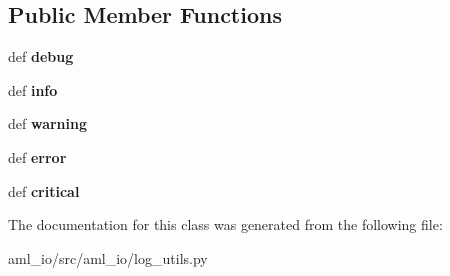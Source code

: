 \subsection*{Public Member Functions}
\begin{DoxyCompactItemize}
\item 
\hypertarget{classaml__io_1_1log__utils_1_1aml__logging_a3d1c59219efd99ec1410eeb564a94fd8}{def {\bfseries debug}}\label{classaml__io_1_1log__utils_1_1aml__logging_a3d1c59219efd99ec1410eeb564a94fd8}

\item 
\hypertarget{classaml__io_1_1log__utils_1_1aml__logging_a7151cb8ed031a7393120bf542ca3ea43}{def {\bfseries info}}\label{classaml__io_1_1log__utils_1_1aml__logging_a7151cb8ed031a7393120bf542ca3ea43}

\item 
\hypertarget{classaml__io_1_1log__utils_1_1aml__logging_ab4d635f97a0ad5340b4986ad359fd73f}{def {\bfseries warning}}\label{classaml__io_1_1log__utils_1_1aml__logging_ab4d635f97a0ad5340b4986ad359fd73f}

\item 
\hypertarget{classaml__io_1_1log__utils_1_1aml__logging_ad0b4a07e0f166e346faecb9ff5e0627c}{def {\bfseries error}}\label{classaml__io_1_1log__utils_1_1aml__logging_ad0b4a07e0f166e346faecb9ff5e0627c}

\item 
\hypertarget{classaml__io_1_1log__utils_1_1aml__logging_a7220b4a7b5b8c7b09fdbea2ab9cfbcd1}{def {\bfseries critical}}\label{classaml__io_1_1log__utils_1_1aml__logging_a7220b4a7b5b8c7b09fdbea2ab9cfbcd1}

\end{DoxyCompactItemize}


The documentation for this class was generated from the following file\-:\begin{DoxyCompactItemize}
\item 
aml\-\_\-io/src/aml\-\_\-io/log\-\_\-utils.\-py\end{DoxyCompactItemize}
